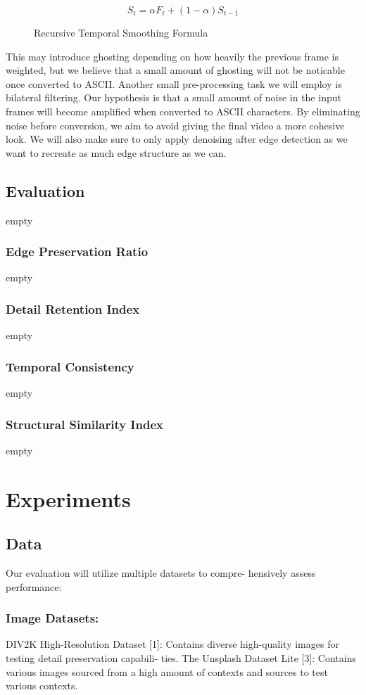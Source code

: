 \documentclass[10pt,twocolumn,letterpaper]{article}
\begin{document}
\begin{figure}[H]
\centering
\[
S_t = \alpha F_t + (1 - \alpha) S_{t-1}
\]
\caption{Recursive Temporal Smoothing Formula}
\label{fig:smoothing}
\end{figure}

This may introduce ghosting depending on how heavily the previous frame is weighted, but we believe that a small amount of ghosting will not be noticable once converted to ASCII. Another small pre-processing task we will employ is bilateral filtering. Our hypothesis is that a small amount of noise in the input frames will become amplified when converted to ASCII characters. By eliminating noise before conversion, we aim to avoid giving the final video a more cohesive look. We will also make sure to only apply denoising after edge detection as we want to recreate as much edge structure as we can.

\subsection{Evaluation}
empty

\subsubsection{Edge Preservation Ratio}
empty

\subsubsection{Detail Retention Index}
empty

\subsubsection{Temporal Consistency}
empty

\subsubsection{Structural Similarity Index}
empty

\section{Experiments}
\subsection{Data}
Our evaluation will utilize multiple datasets to compre-
hensively assess performance:
\subsubsection{Image Datasets:}
DIV2K High-Resolution Dataset [1]: Contains diverse
high-quality images for testing detail preservation capabili-
ties.
The Unsplash Dataset Lite [3]: Contains various images
sourced from a high amount of contexts and sources to test
various contexts.
\end{document}
